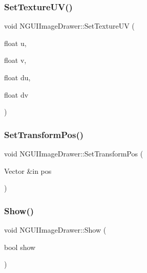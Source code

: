 \hypertarget{class_n_g_u_i_image_drawer_a00f94706f18c7702eec4d2ec224a3168}{}\label{class_n_g_u_i_image_drawer_a00f94706f18c7702eec4d2ec224a3168} 
\subsubsection{\texorpdfstring{Set\+Texture\+U\+V()}{SetTextureUV()}}
{\footnotesize\ttfamily void N\+G\+U\+I\+Image\+Drawer\+::\+Set\+Texture\+UV (\begin{DoxyParamCaption}\item[{float}]{u,  }\item[{float}]{v,  }\item[{float}]{du,  }\item[{float}]{dv }\end{DoxyParamCaption})}

\hypertarget{class_n_g_u_i_image_drawer_a47a6c352ca3c5343f08506097b413fb3}{}\label{class_n_g_u_i_image_drawer_a47a6c352ca3c5343f08506097b413fb3} 
\subsubsection{\texorpdfstring{Set\+Transform\+Pos()}{SetTransformPos()}}
{\footnotesize\ttfamily void N\+G\+U\+I\+Image\+Drawer\+::\+Set\+Transform\+Pos (\begin{DoxyParamCaption}\item[{Vector \&in}]{pos }\end{DoxyParamCaption})}

\hypertarget{class_n_g_u_i_image_drawer_a5721081398080170fb1258cd76d59b93}{}\label{class_n_g_u_i_image_drawer_a5721081398080170fb1258cd76d59b93} 
\subsubsection{\texorpdfstring{Show()}{Show()}}
{\footnotesize\ttfamily void N\+G\+U\+I\+Image\+Drawer\+::\+Show (\begin{DoxyParamCaption}\item[{bool}]{show }\end{DoxyParamCaption})}



